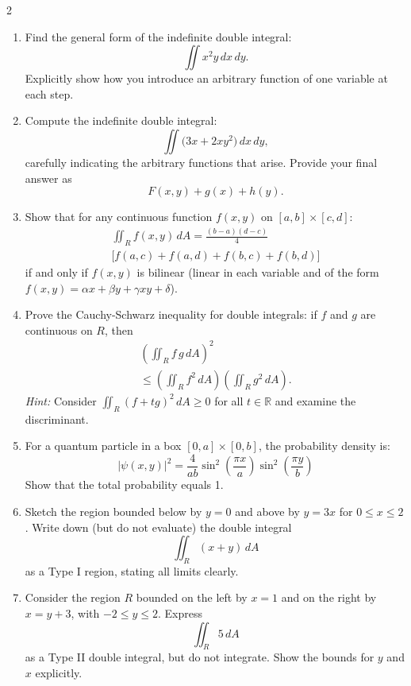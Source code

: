 \begin{multicols}{2}
\begin{enumerate}
\item 
Find the general form of the indefinite double integral:
\[
\iint x^2 y \,dx\,dy.
\]
Explicitly show how you introduce an arbitrary function of one variable at each step.

\item 
Compute the indefinite double integral:
\[
\iint \bigl( 3x + 2xy^2 \bigr)\,dx\,dy,
\]
carefully indicating the arbitrary functions that arise. Provide your final answer as
\[
F(x,y) + g(x) + h(y).
\]

    \item Show that for any continuous function \(f(x,y)\) on \([a,b] \times [c,d]\):
    \begin{multline*}
        \iint_R f(x,y)\,dA = \frac{(b-a)(d-c)}{4}  \\
        \big[f(a,c) + f(a,d) + f(b,c) + f(b,d)\big]
    \end{multline*}
    if and only if \(f(x,y)\) is bilinear (linear in each variable and of the form $f(x,y) = \alpha x + \beta y + \gamma xy + \delta$).

\item Prove the Cauchy-Schwarz inequality for double integrals: if \(f\) and \(g\) are continuous on \(R\), then
    \begin{multline*}
\left(\iint_R f \, g \, dA\right)^{\!2} \\
\leq \left(\iint_R f^2 \, dA\right)\!\left(\iint_R g^2 \, dA\right).
    \end{multline*}
    \textit{Hint:} Consider \(\iint_R (f + tg)^2 \, dA \geq 0\) for all \(t \in \mathbb{R}\) and examine the discriminant.

\item For a quantum particle in a box \([0,a] \times [0,b]\), the probability density is:
\[
|\psi(x,y)|^2 = \frac{4}{ab}\sin^2(\frac{\pi x}{a})\sin^2(\frac{\pi y}{b})
\]
Show that the total probability equals 1.

\item Sketch the region bounded below by $y=0$ and above by $y=3x$ for $0 \le x \le 2$. Write down (but do not evaluate) the double integral
\[
\iint_R (x + y)\, dA
\]
as a Type I region, stating all limits clearly.

\item Consider the region $R$ bounded on the left by $x=1$ and on the right by $x = y + 3$, with $-2 \le y \le 2$. Express
\[
\iint_R 5\,dA
\]
as a Type II double integral, but do not integrate. Show the bounds for $y$ and $x$ explicitly.


\end{enumerate}
\end{multicols}
